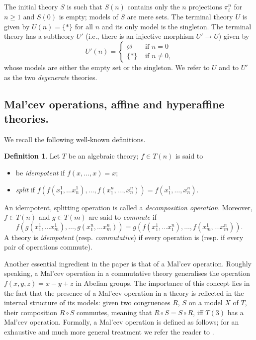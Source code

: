 \documentclass{amsart}
\numberwithin{equation}{section}
\theoremstyle{plain}
\theoremstyle{definition}
\newtheorem{definition}[theorem]{Definition}
\begin{document}
The initial theory $S$ is such that $S(n)$ contains only the $n$ projections $\pi^n_i$ for $n \ge 1$ and $S(0)$ is empty; models of $S$ are mere sets. 
The terminal theory $U$ is given by $U(n)=\{*\}$ for all $n$ and its only model is the singleton. 
The terminal theory has a subtheory $U'$ (i.e., there is an injective morphism $U' \to U$) given by 
\begin{equation*}
    U'(n) = 
    \begin{cases}
      \varnothing & \text{ if } n = 0 \\
      \{*\} & \text{ if } n \neq 0 \text{,}
    \end{cases}
  \end{equation*}
whose models are either the empty set or the singleton. 
We refer to $U$ and to $U'$ as the two \emph{degenerate} theories. 

\subsection{Mal'cev operations, affine and hyperaffine theories.}
We recall the following well-known definitions. 

\begin{definition} 
  \label{def:icd}
  Let $T$ be an algebraic theory; $f \in T(n)$ is said to 
  \begin{itemize}
  \item be \emph{idempotent} if $f(x,\ldots,x)=x$; 
  \item \emph{split} if 
    $f(f(x^1_1, \ldots x^1_n), \ldots, f(x^n_1, \ldots, x^n_n)) = f(x^1_1, \ldots, x^n_n)\text{.}$
  \end{itemize}
  An idempotent, splitting operation is called a \emph{decomposition operation}. 
  Moreover, $f \in T(n)$ and $g \in T(m)$
  are said to \emph{commute} if 
    \begin{equation*}
      f(g(x^1_1, \ldots x^1_m), \ldots, g(x^n_1, \ldots x^n_m)) = g(f(x^1_1, \ldots x^n_1), \ldots, f(x^1_m, \ldots x^n_m))\text{.}
    \end{equation*}
  A theory is \emph{idempotent} (resp. \emph{commutative}) if every operation is (resp. if every pair of operations commute). 
\end{definition}

Another essential ingredient in the paper is that of a Mal'cev operation. 
Roughly speaking, a Mal'cev operation in a commutative theory generalises the operation $f(x,y,z)=x-y+z$ in Abelian groups. 
The importance of this concept lies in the fact that the presence of a Mal'cev operation in a theory is reflected in the internal structure of its models: 
given two congruences $R$, $S$ on a model $X$ of $T$, their composition $R \circ S$ commutes, meaning that $R \circ S = S \circ R$, iff $T(3)$ has a Mal'cev operation.
Formally, a Mal'cev operation is defined as follows; 
for an exhaustive and much more general treatment we refer the reader to \cite{Smith,BB04}. 
\end{document}
